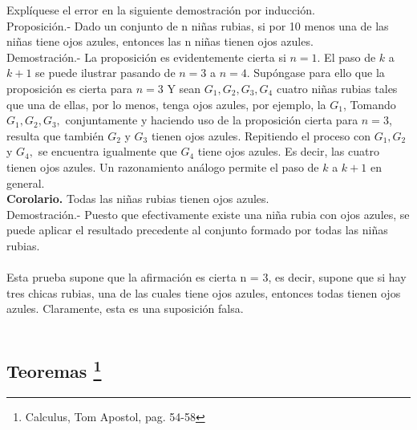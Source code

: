 \begin{ej}
Explíquese el error en la siguiente demostración por inducción.\\
Proposición.- Dado un conjunto de n niñas rubias, si por 10 menos una de las niñas tiene ojos azules, entonces las n niñas tienen ojos azules.\\
Demostración.-\; La proposición es evidentemente cierta si $n = 1$. El paso de $k$ a $k + 1$ se puede ilustrar pasando de $n = 3$ a $n = 4$. Supóngase para ello que la proposición es cierta para $n=3$ Y sean $G_1, G_2, G_3, G_4$ cuatro niñas rubias tales que una de ellas, por lo menos, tenga ojos azules, por ejemplo, la $G_1$, Tomando $G_1,G_2, G_3,$ conjuntamente y haciendo uso de la proposición cierta para $n =3$, resulta que también $G_2$ y $G_3$ tienen ojos azules. Repitiendo el proceso con $G_1, G_2$ y $G_4,$ se encuentra igualmente que $G_4$ tiene ojos azules. Es decir, las cuatro tienen ojos azules. Un razonamiento análogo permite el paso de $k$ a $k + 1$ en general.\\
\textbf{Corolario.} Todas las niñas rubias tienen ojos azules.\\
Demostración.- \; Puesto que efectivamente existe una niña rubia con ojos azules, se puede aplicar el resultado precedente al conjunto formado por todas las niñas rubias.\\\\
Esta prueba supone que la afirmación es cierta n = 3, es decir, supone que si hay tres chicas rubias, una de las cuales tiene ojos azules, entonces todas tienen ojos azules. Claramente, esta es una suposición falsa.\\\\
\end{ej}



\subsection[Teoremas]{Teoremas \footnote{Calculus, Tom Apostol, pag. 54-58}}

